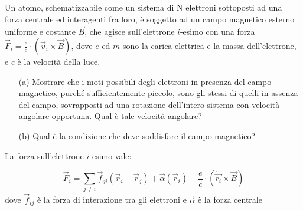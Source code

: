 \documentclass[../main.tex]{subfiles}
\begin{document}
  \newcommand\ecmvprod{\times}

  \textex
  Un atomo, schematizzabile come un sistema di N elettroni sottoposti ad una forza centrale ed interagenti fra loro, \`e soggetto ad un campo magnetico esterno uniforme e costante $\vec B$, che agisce sull'elettrone $i$-esimo con una forza $\vec F_i = \frac{e}{c} \cdot \left(\vec v_i \ecmvprod \vec B\right)$, dove $e$ ed $m$ sono la carica elettrica e la massa dell'elettrone, e $c$ \`e la velocit\`a della luce.

  \begin{itemize}
    \item[(a)] Mostrare che i moti possibili degli elettroni in presenza del campo magnetico, purch\'e sufficientemente piccolo, sono gli stessi di quelli in assenza del campo, sovrapposti ad una rotazione dell'intero sistema con velocit\`a angolare opportuna. \newline
    Qual \`e tale velocit\`a angolare?
    \item[(b)]Qual \`e la condizione che deve soddisfare il campo magnetico?
  \end{itemize}

  \solution
  La forza sull'elettrone $i$-esimo vale:
  
  \begin{equation}
    \label{ecm:forzai}
    \vec F_i= \sum_{j \neq i} \vec f_{ji}(\vec r_i-\vec r_j)+\vec \alpha(\vec r_i)+\frac{e}{c} \cdot \left(\dot {\vec {r_i}} \ecmvprod \vec B\right)
  \end{equation}
  dove $\vec f_{ij}$ \`e la forza di interazione tra gli elettroni e $\vec \alpha$ \`e la forza centrale
  
  
  
  
\end{document}
